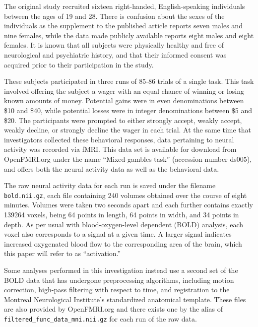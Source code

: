
\par The original study recruited sixteen right-handed, English-speaking
individuals between the ages of 19 and 28. There is confusion about the sexes of
the individuals as the supplement to the published article reports seven males
and nine females, while the data made publicly available reports eight males and
eight females. It is known that all subjects were physically healthy and free of
neurological and psychiatric history, and that their informed consent was
acquired prior to their participation in the study.

\par \indent These subjects participated in three runs of 85-86 trials of a
single task. This task involved offering the subject a wager with an equal
chance of winning or losing known amounts of money. Potential gains were in even
denominations between \$10 and \$40, while potential losses were in integer
denominations between \$5 and \$20. The participants were prompted to either
strongly accept, weakly accept, weakly decline, or strongly decline the wager in
each trial. At the same time that investigators collected these behavioral
responses, data pertaining to neural activity was recorded via fMRI. This data
set is available for download from OpenFMRI.org under the name ``Mixed-gambles
task'' (accession number ds005), and offers both the neural activity data as
well as the behavioral data.

\par \indent The raw neural activity data for each run is saved under the
filename \texttt{bold.nii.gz}, each file containing 240 volumes obtained over
the course of eight minutes. Volumes were taken two seconds apart and each
further contains exactly 139264 voxels, being 64 points in length, 64 points in
width, and 34 points in depth. As per usual with blood-oxygen-level dependent
(BOLD) analysis, each voxel also corresponds to a signal at a given time. A
larger signal indicates increased oxygenated blood flow to the corresponding
area of the brain, which this paper will refer to as ``activation.''

\par \indent Some analyses performed in this investigation instead use a second
set of the BOLD data that has undergone preprocessing algorithms, including
motion correction, high-pass filtering with respect to time, and registration to
the Montreal Neurological Institute's standardized anatomical template. These
files are also provided by OpenFMRI.org and there exists one by the alias of
\texttt{filtered\_func\_data\_mni.nii.gz} for each run of the raw data.

